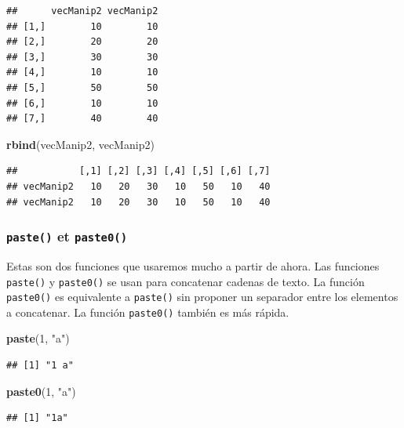 \documentclass[]{book}
\newenvironment{Shaded}{\begin{snugshade}}{\end{snugshade}}
\newcommand{\KeywordTok}[1]{\textcolor[rgb]{0.13,0.29,0.53}{\textbf{#1}}}
\newcommand{\DecValTok}[1]{\textcolor[rgb]{0.00,0.00,0.81}{#1}}
\newcommand{\StringTok}[1]{\textcolor[rgb]{0.31,0.60,0.02}{#1}}
\newcommand{\NormalTok}[1]{#1}
\begin{document}
\begin{verbatim}
##      vecManip2 vecManip2
## [1,]        10        10
## [2,]        20        20
## [3,]        30        30
## [4,]        10        10
## [5,]        50        50
## [6,]        10        10
## [7,]        40        40
\end{verbatim}

\begin{Shaded}
\begin{Highlighting}[]
\KeywordTok{rbind}\NormalTok{(vecManip2, vecManip2)}
\end{Highlighting}
\end{Shaded}

\begin{verbatim}
##           [,1] [,2] [,3] [,4] [,5] [,6] [,7]
## vecManip2   10   20   30   10   50   10   40
## vecManip2   10   20   30   10   50   10   40
\end{verbatim}

\subsubsection{\texorpdfstring{\texttt{paste()} et
\texttt{paste0()}}{paste() et paste0()}}\label{l015paste}

Estas son dos funciones que usaremos mucho a partir de ahora. Las
funciones \texttt{paste()} y \texttt{paste0()} se usan para concatenar
cadenas de texto. La función \texttt{paste0()} es equivalente a
\texttt{paste()} sin proponer un separador entre los elementos a
concatenar. La función \texttt{paste0()} también es más rápida.

\begin{Shaded}
\begin{Highlighting}[]
\KeywordTok{paste}\NormalTok{(}\DecValTok{1}\NormalTok{, }\StringTok{"a"}\NormalTok{)}
\end{Highlighting}
\end{Shaded}

\begin{verbatim}
## [1] "1 a"
\end{verbatim}

\begin{Shaded}
\begin{Highlighting}[]
\KeywordTok{paste0}\NormalTok{(}\DecValTok{1}\NormalTok{, }\StringTok{"a"}\NormalTok{)}
\end{Highlighting}
\end{Shaded}

\begin{verbatim}
## [1] "1a"
\end{verbatim}
\end{document}
